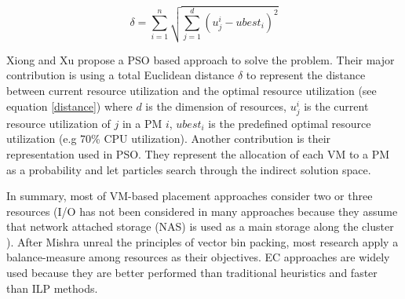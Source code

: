 \begin{equation} \label{distance}
	\delta = \sum_{i=1}^n \sqrt{\sum_{j=1}^d (u_j^i - ubest_i)^2}
\end{equation}

Xiong and Xu \cite{Xiong:2014jq} propose a PSO based approach to solve the problem. Their major contribution is using a total Euclidean distance $\delta$ to represent the distance between current resource utilization and the optimal resource utilization (see equation \ref{distance}) where $d$ is the dimension of resources, $u_j^i$ is the current resource utilization of $j$ in a PM $i$, $ubest_i$ is the predefined optimal resource utilization (e.g 70\% CPU utilization). Another contribution is their representation used in PSO. They represent the allocation of each VM to a PM as a probability and let particles search through the indirect solution space.

In summary, most of VM-based placement approaches consider two or three resources (I/O has not been considered in many approaches because they assume that network attached storage (NAS) is used as a main storage along the cluster \cite{Murtazaev:2014eo}). After Mishra unreal the principles of vector bin packing, most research apply a balance-measure among resources as their objectives. EC approaches are widely used because they are better performed than traditional heuristics and faster than ILP methods.






